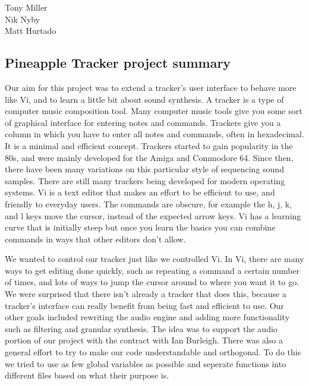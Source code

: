\documentclass[12pt,letterpaper]{article}
\begin{document}
\begin{flushright}
Tony Miller\\
Nik Nyby\\
Matt Hurtado
\end{flushright}

\begin{center}
\section*{Pineapple Tracker project summary}
\end{center}


\doublespacing

\par
Our aim for this project was to extend a tracker's user interface to behave more like Vi, and to learn a little bit about sound synthesis.
A tracker is a type of computer music composition tool.
Many computer music tools give you some sort of graphical interface for entering notes and commands.
Trackers give you a column in which you have to enter all notes and commands, often in hexadecimal.
It is a minimal and efficient concept.
Trackers started to gain popularity in the 80s, and were mainly developed for the Amiga and Commodore 64.
Since then, there have been many variations on this particular style of sequencing sound samples.
There are still many trackers being developed for modern operating systems.
Vi is a text editor that makes an effort to be efficient to use, and friendly to everyday users.
The commands are obscure, for example the h, j, k, and l keys move the cursor, instead of the expected arrow keys.
Vi has a learning curve that is initially steep but once you learn the basics you can combine commands in ways that other editors don't allow.

\par
We wanted to control our tracker just like we controlled Vi.
In Vi, there are many ways to get editing done quickly, such as repeating a command a certain number of times, and lots of ways to jump the cursor around to where you want it to go.
We were surprised that there isn't already a tracker that does this, because a tracker's interface can really benefit from being fast and efficient to use.
Our other goals included rewriting the audio engine and adding more functionality such as filtering and granular synthesis.
The idea was to support the audio portion of our project with the contract with Ian Burleigh.
There was also a general effort to try to make our code understandable and orthogonal.
To do this we tried to use as few global variables as possible and seperate functions into different files based on what their purpose is.
\end{document}
